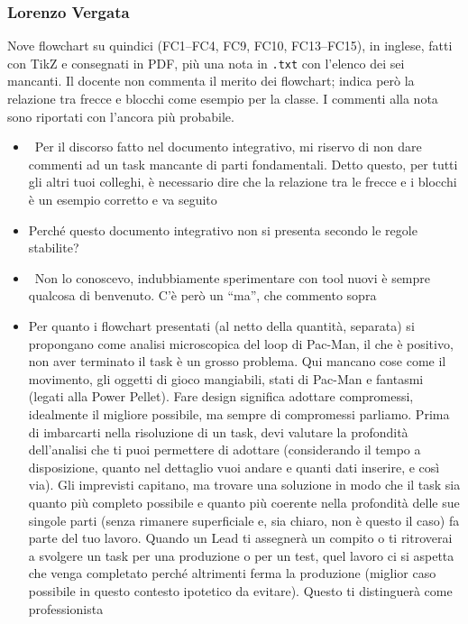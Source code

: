 \subsubsection{Lorenzo Vergata}
Nove flowchart su quindici (FC1--FC4, FC9, FC10, FC13--FC15), in inglese, fatti
con TikZ e consegnati in PDF, più una nota in \texttt{.txt} con l'elenco dei sei
mancanti. Il docente non commenta il merito dei flowchart; indica però la
relazione tra frecce e blocchi come esempio per la classe. I commenti alla
nota sono riportati con l'ancora più probabile.
{\small
\begin{itemize}
  \item {} \rvAvviso\ Per il discorso fatto nel documento integrativo, mi riservo di non dare commenti ad un task mancante di parti fondamentali. Detto questo, per tutti gli altri tuoi colleghi, è necessario dire che la relazione tra le frecce e i blocchi è un esempio corretto e va seguito
  \item {} Perché questo documento integrativo non si presenta secondo le regole stabilite?
  \item {} \rvBene\ Non lo conoscevo, indubbiamente sperimentare con tool nuovi è sempre qualcosa di benvenuto. C'è però un ``ma'', che commento sopra
  \item {} Per quanto i flowchart presentati (al netto della quantità, separata) si propongano come analisi microscopica del loop di Pac-Man, il che è positivo, non aver terminato il task è un grosso problema. Qui mancano cose come il movimento, gli oggetti di gioco mangiabili, stati di Pac-Man e fantasmi (legati alla Power Pellet). Fare design significa adottare compromessi, idealmente il migliore possibile, ma sempre di compromessi parliamo. Prima di imbarcarti nella risoluzione di un task, devi valutare la profondità dell'analisi che ti puoi permettere di adottare (considerando il tempo a disposizione, quanto nel dettaglio vuoi andare e quanti dati inserire, e così via). Gli imprevisti capitano, ma trovare una soluzione in modo che il task sia quanto più completo possibile e quanto più coerente nella profondità delle sue singole parti (senza rimanere superficiale e, sia chiaro, non è questo il caso) fa parte del tuo lavoro. Quando un Lead ti assegnerà un compito o ti ritroverai a svolgere un task per una produzione o per un test, quel lavoro ci si aspetta che venga completato perché altrimenti ferma la produzione (miglior caso possibile in questo contesto ipotetico da evitare). Questo ti distinguerà come professionista
\end{itemize}
}

